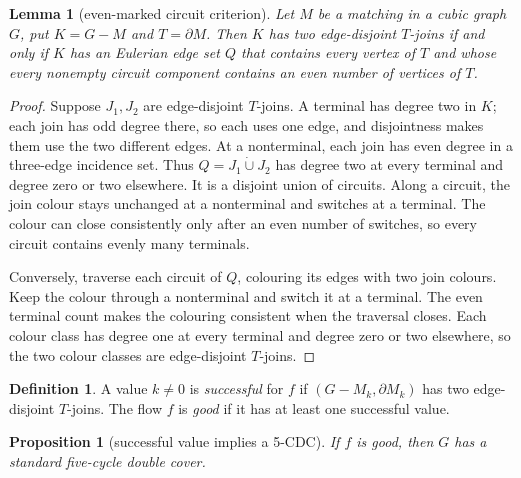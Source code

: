 \documentclass[11pt]{article}
\newtheorem{proposition}[theorem]{Proposition}
\newtheorem{lemma}[theorem]{Lemma}
\theoremstyle{definition}
\newtheorem{definition}[theorem]{Definition}
\theoremstyle{remark}
\newcommand{\bd}{\partial}
\begin{document}
\begin{lemma}[even-marked circuit criterion]\label{lem:criterion}
Let \(M\) be a matching in a cubic graph \(G\), put
\(K=G-M\) and \(T=\bd M\).  Then \(K\) has two edge-disjoint
\(T\)-joins if and only if \(K\) has an Eulerian edge set \(Q\) that
contains every vertex of \(T\) and whose every nonempty circuit component
contains an even number of vertices of \(T\).
\end{lemma}

\begin{proof}
Suppose \(J_1,J_2\) are edge-disjoint \(T\)-joins.  A terminal has degree
two in \(K\); each join has odd degree there, so each uses one edge, and
disjointness makes them use the two different edges.  At a nonterminal,
each join has even degree in a three-edge incidence set.  Thus
\(Q=J_1\mathbin{\dot\cup}J_2\) has degree two at every terminal and degree
zero or two elsewhere.  It is a disjoint union of circuits.  Along a
circuit, the join colour stays unchanged at a nonterminal and switches at
a terminal.  The colour can close consistently only after an even number
of switches, so every circuit contains evenly many terminals.

Conversely, traverse each circuit of \(Q\), colouring its edges with two
join colours.  Keep the colour through a nonterminal and switch it at a
terminal.  The even terminal count makes the colouring consistent when
the traversal closes.  Each colour class has degree one at every terminal
and degree zero or two elsewhere, so the two colour classes are
edge-disjoint \(T\)-joins.
\end{proof}

\begin{definition}
A value \(k\ne0\) is \emph{successful} for \(f\) if
\((G-M_k,\bd M_k)\) has two edge-disjoint \(T\)-joins.  The flow \(f\) is
\emph{good} if it has at least one successful value.
\end{definition}

\begin{proposition}[successful value implies a 5-CDC]\label{prop:success}
If \(f\) is good, then \(G\) has a standard five-cycle double cover.
\end{proposition}
\end{document}
